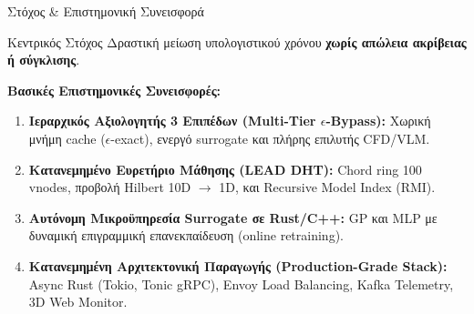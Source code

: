 \begin{frame}{Στόχος \& Επιστημονική Συνεισφορά}
  \begin{block}{Κεντρικός Στόχος}
    Δραστική μείωση υπολογιστικού χρόνου \textbf{χωρίς απώλεια ακρίβειας ή σύγκλισης}.
  \end{block}

  \vspace{0.1cm}
  \textbf{Βασικές Επιστημονικές Συνεισφορές:}
  \begin{enumerate}
    \item \textbf{Ιεραρχικός Αξιολογητής 3 Επιπέδων (Multi-Tier $\epsilon$-Bypass):}
    Χωρική μνήμη cache ($\epsilon$-exact), ενεργό surrogate και πλήρης επιλυτής CFD/VLM.
    \item \textbf{Κατανεμημένο Ευρετήριο Μάθησης (LEAD DHT):}
    Chord ring 100 vnodes, προβολή Hilbert 10D $\to$ 1D, και Recursive Model Index (RMI).
    \item \textbf{Αυτόνομη Μικροϋπηρεσία Surrogate σε Rust/C++:}
    GP και MLP με δυναμική επιγραμμική επανεκπαίδευση (online retraining).
    \item \textbf{Κατανεμημένη Αρχιτεκτονική Παραγωγής (Production-Grade Stack):}
    Async Rust (Tokio, Tonic gRPC), Envoy Load Balancing, Kafka Telemetry, 3D Web Monitor.
  \end{enumerate}
\end{frame}
